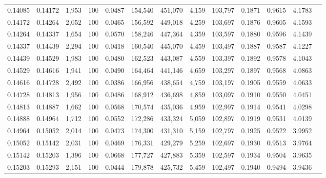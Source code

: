 \begin{tabular}{rrrrrrrrrrrrr}
0.14085 & 0.14172 & 1,953 & 100 &                                     0.0487 & 154,540 & 451,070 &   4,159 & 103,797 & 0.1871 & 0.9615 & 4.1783 \\
0.14172 & 0.14264 & 2,052 & 100 &                                     0.0465 & 156,592 & 449,018 &   4,259 & 103,697 & 0.1876 & 0.9605 & 4.1593 \\
0.14264 & 0.14337 & 1,654 & 100 &                                     0.0570 & 158,246 & 447,364 &   4,359 & 103,597 & 0.1880 & 0.9596 & 4.1439 \\
0.14337 & 0.14439 & 2,294 & 100 &                                     0.0418 & 160,540 & 445,070 &   4,459 & 103,497 & 0.1887 & 0.9587 & 4.1227 \\
0.14439 & 0.14529 & 1,983 & 100 &                                     0.0480 & 162,523 & 443,087 &   4,559 & 103,397 & 0.1892 & 0.9578 & 4.1043 \\
0.14529 & 0.14616 & 1,941 & 100 &                                     0.0490 & 164,464 & 441,146 &   4,659 & 103,297 & 0.1897 & 0.9568 & 4.0863 \\
0.14616 & 0.14728 & 2,492 & 100 &                                     0.0386 & 166,956 & 438,654 &   4,759 & 103,197 & 0.1905 & 0.9559 & 4.0633 \\
0.14728 & 0.14813 & 1,956 & 100 &                                     0.0486 & 168,912 & 436,698 &   4,859 & 103,097 & 0.1910 & 0.9550 & 4.0451 \\
0.14813 & 0.14887 & 1,662 & 100 &                                     0.0568 & 170,574 & 435,036 &   4,959 & 102,997 & 0.1914 & 0.9541 & 4.0298 \\
0.14888 & 0.14964 & 1,712 & 100 &                                     0.0552 & 172,286 & 433,324 &   5,059 & 102,897 & 0.1919 & 0.9531 & 4.0139 \\
0.14964 & 0.15052 & 2,014 & 100 &                                     0.0473 & 174,300 & 431,310 &   5,159 & 102,797 & 0.1925 & 0.9522 & 3.9952 \\
0.15052 & 0.15142 & 2,031 & 100 &                                     0.0469 & 176,331 & 429,279 &   5,259 & 102,697 & 0.1930 & 0.9513 & 3.9764 \\
0.15142 & 0.15203 & 1,396 & 100 &                                     0.0668 & 177,727 & 427,883 &   5,359 & 102,597 & 0.1934 & 0.9504 & 3.9635 \\
0.15203 & 0.15293 & 2,151 & 100 &                                     0.0444 & 179,878 & 425,732 &   5,459 & 102,497 & 0.1940 & 0.9494 & 3.9436 \\

\end{tabular}
